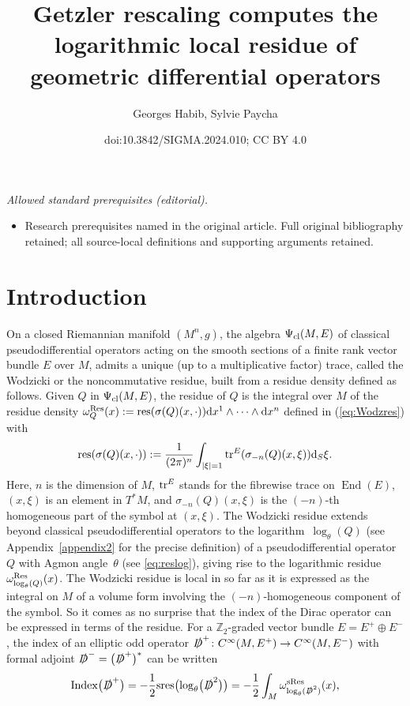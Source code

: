 \documentclass[10pt,a4paper]{amsart}
\title{Getzler rescaling computes the logarithmic local residue of geometric differential operators}
\author{Georges Habib, Sylvie Paycha}
\date{doi:10.3842/SIGMA.2024.010; CC BY 4.0}
\numberwithin{equation}{section}
\theoremstyle{definition}
\newcommand{\Z}{\mathbb Z}
\begin{document}
\maketitle
\noindent\textit{Allowed standard prerequisites (editorial).}\begin{itemize}
\item Research prerequisites named in the original article. Full original bibliography retained; all source-local definitions and supporting arguments retained.
\end{itemize}\medskip
\section{Introduction}
On a closed Riemannian manifold $(M^n,g)$, the algebra $\Psi_{\rm cl}(M, E)$ of classical pseudodifferential operators acting on the smooth sections of a finite rank vector bundle $E$ over $M$, admits a unique (up to a multiplicative factor) trace, called the Wodzicki \cite{W} or the noncommutative residue, built from a residue density defined as follows. Given $Q$ in $\Psi_{\rm cl}(M,E)$, the residue of $Q$ is the integral over $M$ of the residue density $\omega_Q^ {\rm Res}(x):= {\rm res}(\sigma(Q)(x, \cdot)) {\rm d}x^1\wedge \dots\wedge {\rm d}x^n$ defined in (\ref{eq:Wodzres}) with
\[
{\rm res}(\sigma(Q)(x, \cdot)):=\frac{1}{(2\pi)^n} \int_{|\xi|=1}{\rm tr}^E(\sigma_{-n}(Q) (x, \xi)) {\rm d}_S\xi .
\]
Here, $n$ is the dimension of $M$, ${\rm tr}^E$ stands for the fibrewise trace on $\operatorname{End}(E)$, $(x,\xi)$ is an element in $T^*M$, and $\sigma_{-n}(Q)(x, \xi)$ is the $(-n)$-th homogeneous part of the symbol at $(x, \xi)$. The Wodzicki residue extends beyond classical pseudodifferential operators to the logarithm~$\log_\theta (Q)$ (see Appendix~\ref{appendix2} for the precise definition) of a pseudodifferential operator $Q$ with Agmon angle~$\theta$ (see \eqref{eq:reslog}), giving rise to the logarithmic residue $\omega_{\log_\theta (Q)}^ {\rm Res}(x)$. The Wodzicki residue is local in so far as it is expressed as the integral on $M$ of a volume form involving the $(-n)$-homogeneous component of the symbol. So it comes as no surprise that the index of the Dirac operator can be expressed in terms of the residue. For a $\Z_2$-graded vector bundle $E=E^+\oplus E^-$, the index of an elliptic odd operator $\slashed D^+\colon C^\infty(M, E^+)\to C^\infty(M, E^-)$ with formal adjoint $\slashed D^-=\bigl(\slashed D^+\bigr)^*$ can be written \cite{Sc}
\[
{\rm Index}\bigl(\slashed D^+\bigr)=-\frac{1}{2}{\rm sres}\bigl(\log _\theta\bigl(\slashed D^2\bigr)\bigr)=-\frac{1}{2} \int_M \omega_{\log_\theta (\slashed D^2)}^{{\rm sRes}}(x),
\]
\end{document}
